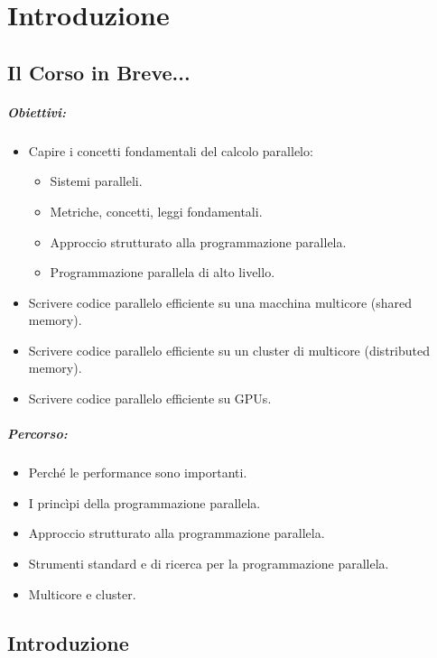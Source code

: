 \chapter{Introduzione}

\section{Il Corso in Breve...}

\paragraph{Obiettivi:}

\begin{itemize}
\item Capire i concetti fondamentali del calcolo parallelo:
\begin{itemize}
  \item Sistemi paralleli. 
  \item Metriche, concetti, leggi fondamentali. 
  \item Approccio strutturato alla programmazione parallela. 
  \item Programmazione parallela di alto livello.
\end{itemize}
\item Scrivere codice parallelo efficiente su una macchina multicore (shared memory). 
\item Scrivere codice parallelo efficiente su un cluster di multicore (distributed memory). 
\item Scrivere codice parallelo efficiente su GPUs.
\end{itemize}

\paragraph{Percorso:}

\begin{itemize}
  \item Perché le performance sono importanti. 
  \item I princìpi della programmazione parallela.
  \item Approccio strutturato alla programmazione parallela. 
  \item Strumenti standard e di ricerca per la programmazione parallela. 
  \item Multicore e cluster.
\end{itemize}

\section{Introduzione}

